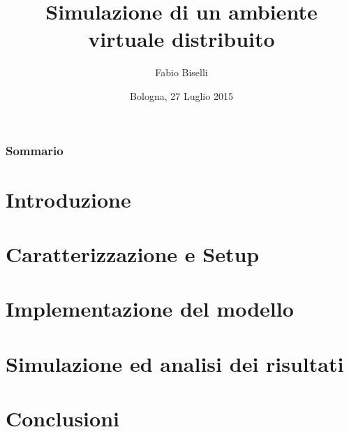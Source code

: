\documentclass[xcolor={usenames,dvipsnames}]{beamer}
\title[Simulazione di un DVE]{Simulazione di un ambiente \\
virtuale distribuito}
\author[Fabio Biselli]{Fabio Biselli}
\institute{%
  {\large Universit\`a di Bologna} \\
  {\large Laurea Magistrale in Informatica} \\
  Corso di Simulazione di Sistemi }
\date{Bologna, 27 Luglio 2015}
\begin{document}
\begin{frame}
  \titlepage
\end{frame}

\begin{frame}%
\frametitle{Sommario} \tableofcontents
\end{frame}

\section{Introduzione}



\section{Caratterizzazione e Setup}



\section{Implementazione del modello}



\section{Simulazione ed analisi dei risultati}



\section{Conclusioni}


\end{document}
